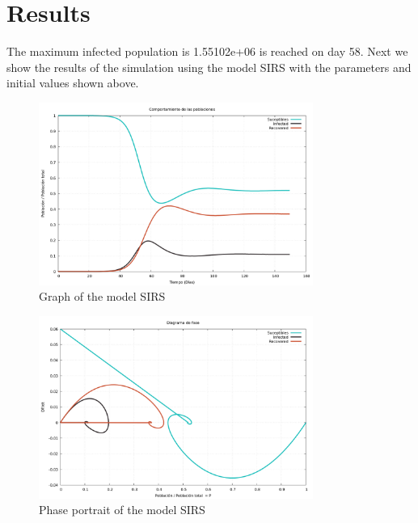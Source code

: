 \documentclass{article}
\begin{document}
\section*{Results}
The maximum infected population is 1.55102e+06 is reached on day 58.
Next we show the results of the simulation using the model SIRS with the parameters and initial values shown above.
\begin{figure}[H]
\centering
\includegraphics[width=0.8\textwidth]{./data/ProyectoSIRS/graph-SIRS.png}
\caption{Graph of the model SIRS}
\end{figure}
\begin{figure}[H]
\centering
\includegraphics[width=0.8\textwidth]{./data/ProyectoSIRS/phase-SIRS.png}
\caption{Phase portrait of the model SIRS}
\end{figure}
\end{document}
